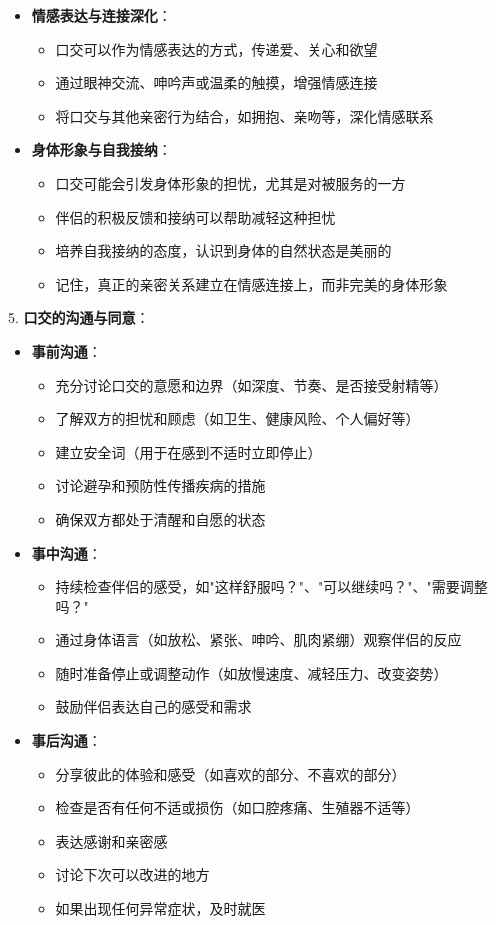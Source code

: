 \documentclass[12pt,UTF8]{ctexbook}
\begin{document}
\begin{itemize}
\begin{itemize}
    \end{itemize}
  \item \textbf{情感表达与连接深化}：
    \begin{itemize}
    \item 口交可以作为情感表达的方式，传递爱、关心和欲望
    \item 通过眼神交流、呻吟声或温柔的触摸，增强情感连接
    \item 将口交与其他亲密行为结合，如拥抱、亲吻等，深化情感联系
    \end{itemize}
  \item \textbf{身体形象与自我接纳}：
    \begin{itemize}
    \item 口交可能会引发身体形象的担忧，尤其是对被服务的一方
    \item 伴侣的积极反馈和接纳可以帮助减轻这种担忧
    \item 培养自我接纳的态度，认识到身体的自然状态是美丽的
    \item 记住，真正的亲密关系建立在情感连接上，而非完美的身体形象
    \end{itemize}
  \end{itemize}

5. \textbf{口交的沟通与同意}：
  \begin{itemize}
  \item \textbf{事前沟通}：
    \begin{itemize}
    \item 充分讨论口交的意愿和边界（如深度、节奏、是否接受射精等）
    \item 了解双方的担忧和顾虑（如卫生、健康风险、个人偏好等）
    \item 建立安全词（用于在感到不适时立即停止）
    \item 讨论避孕和预防性传播疾病的措施
    \item 确保双方都处于清醒和自愿的状态
    \end{itemize}
  \item \textbf{事中沟通}：
    \begin{itemize}
    \item 持续检查伴侣的感受，如"这样舒服吗？"、"可以继续吗？"、"需要调整吗？"
    \item 通过身体语言（如放松、紧张、呻吟、肌肉紧绷）观察伴侣的反应
    \item 随时准备停止或调整动作（如放慢速度、减轻压力、改变姿势）
    \item 鼓励伴侣表达自己的感受和需求
    \end{itemize}
  \item \textbf{事后沟通}：
    \begin{itemize}
    \item 分享彼此的体验和感受（如喜欢的部分、不喜欢的部分）
    \item 检查是否有任何不适或损伤（如口腔疼痛、生殖器不适等）
    \item 表达感谢和亲密感
    \item 讨论下次可以改进的地方
    \item 如果出现任何异常症状，及时就医
    \end{itemize}
  \end{itemize}
\end{document}
